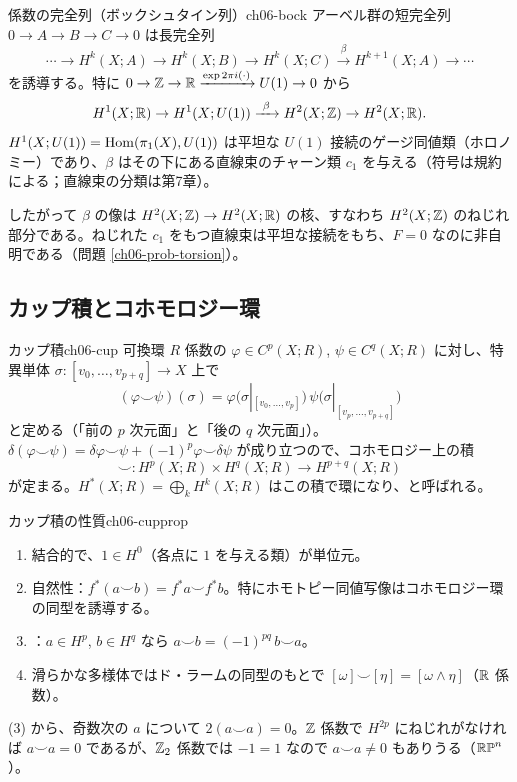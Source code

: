 \begin{mythm}{係数の完全列（ボックシュタイン列）}{ch06-bock}
アーベル群の短完全列 $0\to A\to B\to C\to0$ は長完全列
\[
\cdots\to H^k(X;A)\to H^k(X;B)\to H^k(X;C)\xrightarrow{\ \beta\ }H^{k+1}(X;A)\to\cdots
\]
を誘導する。特に $0\to\mathbb{Z}\to\mathbb{R}\xrightarrow{\exp 2\pi i(\cdot)}U(1)\to0$ から
\[
H^1(X;\R)\to H^1(X;U(1))\xrightarrow{\ \beta\ }H^2(X;\Z)\to H^2(X;\R).
\]
$H^1(X;U(1))=\operatorname{Hom}(\pi_1(X),U(1))$ は平坦な $U(1)$ 接続のゲージ同値類（ホロノミー）であり、$\beta$ はその下にある直線束のチャーン類 $c_1$ を与える（符号は規約による；直線束の分類は第7章）。
\end{mythm}
したがって $\beta$ の像は $H^2(X;\mathbb{Z})\to H^2(X;\mathbb{R})$ の核、すなわち $H^2(X;\mathbb{Z})$ のねじれ部分である。ねじれた $c_1$ をもつ直線束は平坦な接続をもち、$F=0$ なのに非自明である（問題 \ref{ch06-prob-torsion}）。

\subsection{カップ積とコホモロジー環}

\begin{mydef}{カップ積}{ch06-cup}
可換環 $R$ 係数の $\varphi\in C^p(X;R)$, $\psi\in C^q(X;R)$ に対し、特異単体 $\sigma\colon[v_0,\dots,v_{p+q}]\to X$ 上で
\[
(\varphi\smile\psi)(\sigma)=\varphi\bigl(\sigma|_{[v_0,\dots,v_p]}\bigr)\,\psi\bigl(\sigma|_{[v_p,\dots,v_{p+q}]}\bigr)
\]
と定める（「前の $p$ 次元面」と「後の $q$ 次元面」）。$\delta(\varphi\smile\psi)=\delta\varphi\smile\psi+(-1)^p\varphi\smile\delta\psi$ が成り立つので、コホモロジー上の積
\[
\smile\colon H^p(X;R)\times H^q(X;R)\to H^{p+q}(X;R)
\]
が定まる。$H^*(X;R)=\bigoplus_kH^k(X;R)$ はこの積で環になり、と呼ばれる。
\end{mydef}

\begin{mythm}{カップ積の性質}{ch06-cupprop}
\begin{enumerate}
\item 結合的で、$1\in H^0$（各点に $1$ を与える類）が単位元。
\item 自然性：$f^*(a\smile b)=f^*a\smile f^*b$。特にホモトピー同値写像はコホモロジー環の同型を誘導する。
\item {}：$a\in H^p$, $b\in H^q$ なら $a\smile b=(-1)^{pq}\,b\smile a$。
\item 滑らかな多様体ではド・ラームの同型のもとで $[\omega]\smile[\eta]=[\omega\wedge\eta]$（$\mathbb{R}$ 係数）。
\end{enumerate}
\end{mythm}
(3) から、奇数次の $a$ について $2(a\smile a)=0$。$\mathbb{Z}$ 係数で $H^{2p}$ にねじれがなければ $a\smile a=0$ であるが、$\mathbb{Z}_2$ 係数では $-1=1$ なので $a\smile a\neq0$ もありうる（$\mathbb{RP}^n$）。


